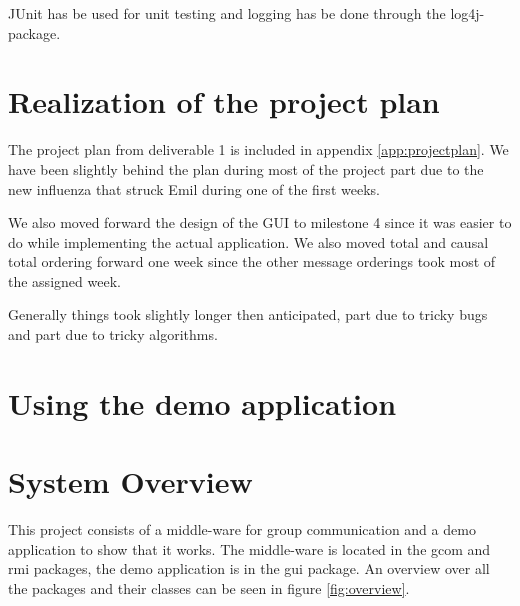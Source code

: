 \documentclass[english]{article}
\begin{document}
JUnit has be used for unit testing and logging has be done through the log4j-package. 

\section{Realization of the project plan}
The project plan from deliverable 1 is included in appendix \vref{app:projectplan}. We have been slightly behind the plan during most of the project part due to the new influenza that struck Emil during one of the first weeks.

We also moved forward the design of the GUI to milestone 4 since it was easier to do while implementing the actual application. We also moved total and causal total ordering forward one week since the other message orderings took most of the assigned week. 

Generally things took slightly longer then anticipated, part due to tricky bugs and part due to tricky algorithms. 

\section{Using the demo application}


\section{System Overview}
This project consists of a middle-ware for group communication and a demo application to show that it works. The middle-ware is located in the gcom and rmi packages, the demo application is in the gui package. An overview over all the packages and their classes can be seen in figure \vref{fig:overview}.
\end{document}
